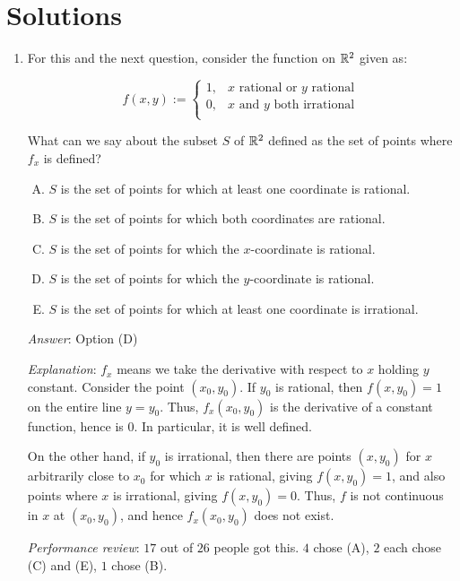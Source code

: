 \documentclass[10pt]{amsart}
\begin{document}
\section{Solutions}

\begin{enumerate}

\item For this and the next question, consider the function on $\mathbb{R}^2$
  given as:

  $$f(x,y) := \left\lbrace \begin{array}{rl} 1, & x \text{ rational  or } y \text { rational }\\0, & x \text{ and } y \text{ both irrational } \\\end{array}\right.$$

  What can we say about the subset $S$ of $\mathbb{R}^2$ defined as the set of
  points where $f_x$ is defined?

  \begin{enumerate}[(A)]
  \item $S$ is the set of points for which at least one coordinate is rational.
  \item $S$ is the set of points for which both coordinates are rational.
  \item $S$ is the set of points for which the $x$-coordinate is rational.
  \item $S$ is the set of points for which the $y$-coordinate is rational.
  \item $S$ is the set of points for which at least one coordinate is
    irrational.
  \end{enumerate}

  {\em Answer}: Option (D)

  {\em Explanation}: $f_x$ means we take the derivative with respect
  to $x$ holding $y$ constant. Consider the point $(x_0,y_0)$. If
  $y_0$ is rational, then $f(x,y_0) = 1$ on the entire line $y =
  y_0$. Thus, $f_x(x_0,y_0)$ is the derivative of a constant function,
  hence is $0$. In particular, it is well defined.

  On the other hand, if $y_0$ is irrational, then there are points
  $(x,y_0)$ for $x$ arbitrarily close to $x_0$ for which $x$ is
  rational, giving $f(x,y_0) = 1$, and also points where $x$ is
  irrational, giving $f(x,y_0) = 0$. Thus, $f$ is not continuous in
  $x$ at $(x_0,y_0)$, and hence $f_x(x_0,y_0)$ does not exist.

  {\em Performance review}: $17$ out of $26$ people got this. $4$
  chose (A), $2$ each chose (C) and (E), $1$ chose (B).


\end{enumerate}
\end{document}
